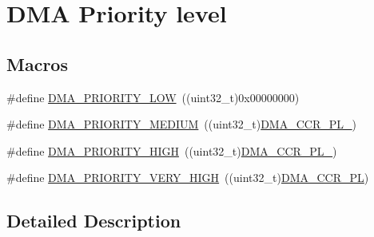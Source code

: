 \hypertarget{group___d_m_a___priority__level}{\section{D\-M\-A Priority level}
\label{group___d_m_a___priority__level}
}
\subsection*{Macros}
\begin{DoxyCompactItemize}
\item 
\#define \hyperlink{group___d_m_a___priority__level_ga0d1ed2bc9229ba3c953002bcf3a72130}{D\-M\-A\-\_\-\-P\-R\-I\-O\-R\-I\-T\-Y\-\_\-\-L\-O\-W}~((uint32\-\_\-t)0x00000000)
\item 
\#define \hyperlink{group___d_m_a___priority__level_gad6fbeee76fd4a02cbed64365bb4c1781}{D\-M\-A\-\_\-\-P\-R\-I\-O\-R\-I\-T\-Y\-\_\-\-M\-E\-D\-I\-U\-M}~((uint32\-\_\-t)\hyperlink{group___peripheral___registers___bits___definition_gaa935d7f115297c5e9e10a62efd065247}{D\-M\-A\-\_\-\-C\-C\-R\-\_\-\-P\-L\-\_})
\item 
\#define \hyperlink{group___d_m_a___priority__level_ga6b2f5c5e22895f8b4bd52a27ec6cae2a}{D\-M\-A\-\_\-\-P\-R\-I\-O\-R\-I\-T\-Y\-\_\-\-H\-I\-G\-H}~((uint32\-\_\-t)\hyperlink{group___peripheral___registers___bits___definition_ga82819927445c9617409bb08e09dc4cd8}{D\-M\-A\-\_\-\-C\-C\-R\-\_\-\-P\-L\-\_})
\item 
\#define \hyperlink{group___d_m_a___priority__level_gaed0542331a4d875d1d8d5b2878e9372c}{D\-M\-A\-\_\-\-P\-R\-I\-O\-R\-I\-T\-Y\-\_\-\-V\-E\-R\-Y\-\_\-\-H\-I\-G\-H}~((uint32\-\_\-t)\hyperlink{group___peripheral___registers___bits___definition_ga97726688157629243aa59bb60e33c284}{D\-M\-A\-\_\-\-C\-C\-R\-\_\-\-P\-L})
\end{DoxyCompactItemize}


\subsection{Detailed Description}


